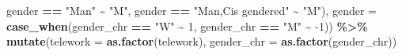 \documentclass[
]{article}
\newenvironment{Shaded}{\begin{snugshade}}{\end{snugshade}}
\newcommand{\DataTypeTok}[1]{\textcolor[rgb]{0.13,0.29,0.53}{#1}}
\newcommand{\DecValTok}[1]{\textcolor[rgb]{0.00,0.00,0.81}{#1}}
\newcommand{\KeywordTok}[1]{\textcolor[rgb]{0.13,0.29,0.53}{\textbf{#1}}}
\newcommand{\NormalTok}[1]{#1}
\newcommand{\OperatorTok}[1]{\textcolor[rgb]{0.81,0.36,0.00}{\textbf{#1}}}
\newcommand{\StringTok}[1]{\textcolor[rgb]{0.31,0.60,0.02}{#1}}
\begin{document}
\begin{Shaded}
\begin{Highlighting}[]
\NormalTok{                       gender }\OperatorTok{==}\StringTok{ "Man"} \OperatorTok{\textasciitilde{}}\StringTok{ "M"}\NormalTok{,}
\NormalTok{                       gender }\OperatorTok{==}\StringTok{ "Man,Cis gendered"} \OperatorTok{\textasciitilde{}}\StringTok{ "M"}\NormalTok{),}
    \DataTypeTok{gender =} \KeywordTok{case\_when}\NormalTok{(gender\_chr }\OperatorTok{==}\StringTok{ "W"} \OperatorTok{\textasciitilde{}}\StringTok{ }\DecValTok{1}\NormalTok{,}
\NormalTok{                       gender\_chr }\OperatorTok{==}\StringTok{  "M"} \OperatorTok{\textasciitilde{}}\StringTok{ }\DecValTok{{-}1}\NormalTok{)) }\OperatorTok{\%\textgreater{}\%}
\StringTok{  }\KeywordTok{mutate}\NormalTok{(}\DataTypeTok{telework =} \KeywordTok{as.factor}\NormalTok{(telework),}
         \DataTypeTok{gender\_chr =} \KeywordTok{as.factor}\NormalTok{(gender\_chr))}
\end{Highlighting}
\end{Shaded}
\end{document}
